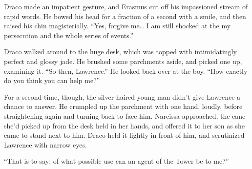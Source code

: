 Draco made an impatient gesture, and Erasmus cut off his impassioned
stream of rapid words. He bowed his head for a fraction of a second with
a smile, and then raised his chin magisterially. ``Yes, forgive
me\ldots{} I am still shocked at the my persecution and the whole series
of events.''

Draco walked around to the huge desk, which was topped with
intimidatingly perfect and glossy jade. He brushed some parchments
aside, and picked one up, examining it. ``So then, Lawrence.'' He looked
back over at the boy. ``How exactly do you think you can help me?''

For a second time, though, the silver-haired young man didn't give
Lawrence a chance to answer. He crumpled up the parchment with one hand,
loudly, before straightening again and turning back to face him.
Narcissa approached, the cane she'd picked up from the desk held in her
hands, and offered it to her son as she came to stand next to him. Draco
held it lightly in front of him, and scrutinized Lawrence with narrow
eyes.

``That is to say: of what possible use can an agent of the Tower be to
me?''
